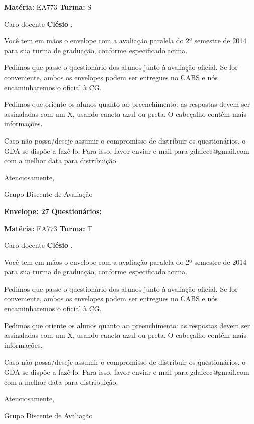 \documentclass[a5paper]{letter}
\begin{document}
\newpage
\thispagestyle{empty}

\hfill {\bf Matéria:} EA773 {\bf Turma:} S

Caro docente {\bf Clésio }, 

	Você tem em mãos o envelope com a avaliação paralela do 2º semestre de 2014 para sua turma de graduação, conforme especificado acima.

	Pedimos que passe o questionário dos alunos junto à avaliação oficial. Se for conveniente, ambos os envelopes podem ser entregues no CABS e nós encaminharemos o oficial à CG.

Pedimos que oriente os alunos quanto ao preenchimento: as respostas devem ser assinaladas com um X, usando caneta azul ou preta. O cabeçalho contém mais informações.

	Caso não possa/deseje assumir o compromisso de distribuir os questionários, o GDA se dispõe a fazê-lo. Para isso, favor enviar e-mail para gdafeec@gmail.com com a melhor data para distribuição.


Atenciosamente, 

Grupo Discente de Avaliação

\vspace{0.5cm}

{\bf Envelope: 27 }		\hfill	{\bf Questionários:} \hspace{2cm}

\newpage
\thispagestyle{empty}

\hfill {\bf Matéria:} EA773 {\bf Turma:} T

Caro docente {\bf Clésio }, 

	Você tem em mãos o envelope com a avaliação paralela do 2º semestre de 2014 para sua turma de graduação, conforme especificado acima.

	Pedimos que passe o questionário dos alunos junto à avaliação oficial. Se for conveniente, ambos os envelopes podem ser entregues no CABS e nós encaminharemos o oficial à CG.

Pedimos que oriente os alunos quanto ao preenchimento: as respostas devem ser assinaladas com um X, usando caneta azul ou preta. O cabeçalho contém mais informações.

	Caso não possa/deseje assumir o compromisso de distribuir os questionários, o GDA se dispõe a fazê-lo. Para isso, favor enviar e-mail para gdafeec@gmail.com com a melhor data para distribuição.


Atenciosamente, 

Grupo Discente de Avaliação
\end{document}
